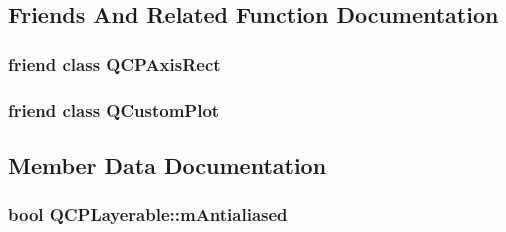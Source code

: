 \subsection{Friends And Related Function Documentation}
\subsubsection[{\texorpdfstring{Q\+C\+P\+Axis\+Rect}{QCPAxisRect}}]{\setlength{\rightskip}{0pt plus 5cm}friend class {\bf Q\+C\+P\+Axis\+Rect}\hspace{0.3cm}{\ttfamily [friend]}}\hypertarget{classQCPLayerable_acbf20ecb140f66c5fd1bc64ae0762990}{}\label{classQCPLayerable_acbf20ecb140f66c5fd1bc64ae0762990}
\subsubsection[{\texorpdfstring{Q\+Custom\+Plot}{QCustomPlot}}]{\setlength{\rightskip}{0pt plus 5cm}friend class {\bf Q\+Custom\+Plot}\hspace{0.3cm}{\ttfamily [friend]}}\hypertarget{classQCPLayerable_a1cdf9df76adcfae45261690aa0ca2198}{}\label{classQCPLayerable_a1cdf9df76adcfae45261690aa0ca2198}


\subsection{Member Data Documentation}
\subsubsection[{\texorpdfstring{m\+Antialiased}{mAntialiased}}]{\setlength{\rightskip}{0pt plus 5cm}bool Q\+C\+P\+Layerable\+::m\+Antialiased\hspace{0.3cm}{\ttfamily [protected]}}\hypertarget{classQCPLayerable_a3ab45a4c76a3333ce42eb217a81733ec}{}\label{classQCPLayerable_a3ab45a4c76a3333ce42eb217a81733ec}
